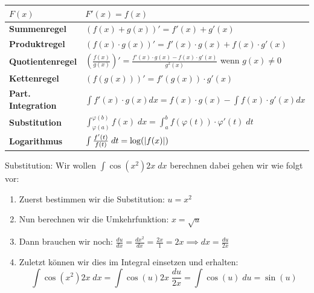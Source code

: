 \renewcommand\arraystretch{1.8}
\begin{center}
    \begin{tabular}{l|l}
        $F(x)$ & $F'(x) = f(x)$ \\
        \hline
        
        \textbf{Summenregel} & $(f(x) + g(x))' = f'(x) + g'(x)$ \\
		\textbf{Produktregel} & $(f(x) \cdot g(x))' = f'(x) \cdot g(x) + f(x) \cdot g'(x)$ \\
		\textbf{Quotientenregel} & $\left( \frac{f(x)}{g(x)} \right)' = \frac{f'(x) \cdot g(x) - f(x) \cdot g'(x)}{g^2(x)}$ wenn $g(x) \neq 0$ \\
		\textbf{Kettenregel} & $(f(g(x)))' = f'(g(x)) \cdot g'(x)$ \\
		\textbf{Part. Integration} & $\int f'(x) \cdot g(x) dx = f(x) \cdot g(x) - \int f(x) \cdot g'(x) dx$ \\
		\textbf{Substitution} & $\int_{\varphi(a)}^{\varphi(b)} f(x) \; dx = \int_a^b f(\varphi(t)) \cdot \varphi'(t) \; dt$ \\
		\textbf{Logarithmus} & $\int \frac{f'(t)}{f(t)} \; dt = \log(\abs{f(x)})$ \\
    \end{tabular}
\end{center}
\renewcommand{\arraystretch}{1}
  
\Bsp Substitution: Wir wollen $\int \cos(x^2) 2x \; dx$ berechnen dabei gehen wir wie folgt vor:

\begin{enumerate}
	\item Zuerst bestimmen wir die Substitution: $u = x^2$
	\item Nun berechnen wir die Umkehrfunktion: $x = \sqrt{u}$
	\item Dann brauchen wir noch: $\frac{du}{dx} = \frac{dx^2}{dx} = \frac{2x}{1} = 2x \implies dx = \frac{du}{2x}$
	\item Zuletzt können wir dies im Integral einsetzen und erhalten:
		$$\int \cos(x^2) 2x \; dx = \int \cos(u) 2x \; \frac{du}{2x} = \int \cos(u) \; du = \sin(u)$$
	
\end{enumerate}



